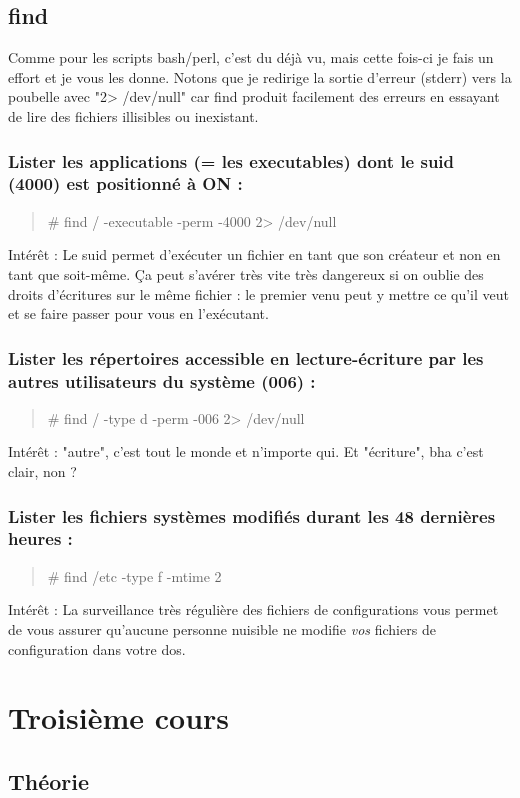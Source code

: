 \documentclass[a4paper]{article}
\newcommand{\commande}[1] {
    \begin{quote}
    \tt\raggedright #1 
    \end{quote}
}
\begin{document}
\subsection{find}
\par Comme pour les scripts bash/perl, c'est du déjà vu, mais cette fois-ci je fais un effort et je vous les donne. Notons que je redirige la sortie d'erreur (stderr) vers la poubelle avec "2> /dev/null" car find produit facilement des erreurs en essayant de lire des fichiers illisibles ou inexistant.
\subsubsection*{Lister les applications (= les executables) dont le suid (4000) est positionné à ON :}
\commande{\# find / -executable -perm -4000 2> /dev/null}
\par Intérêt : Le suid permet d'exécuter un fichier en tant que son créateur et non en tant que soit-même. Ça peut s'avérer très vite très dangereux si on oublie des droits d'écritures sur le même fichier : le premier venu peut y mettre ce qu'il veut et se faire passer pour vous en l'exécutant.
\subsubsection*{Lister les répertoires accessible en lecture-écriture par les autres utilisateurs du système (006) :}
\commande{\# find / -type d -perm -006 2> /dev/null}
\par Intérêt : "autre", c'est tout le monde et n'importe qui. Et "écriture", bha c'est clair, non ?
\subsubsection*{Lister les fichiers systèmes modifiés durant les 48 dernières heures :}
\commande{\# find /etc -type f -mtime 2}
\par Intérêt : La surveillance très régulière des fichiers de configurations vous permet de vous assurer qu'aucune personne nuisible ne modifie \emph{vos} fichiers de configuration dans votre dos.

\section{Troisième cours}
\subsection{Théorie}
\end{document}

